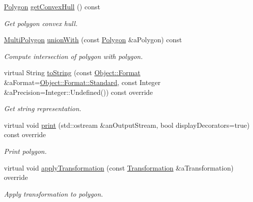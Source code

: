 \begin{DoxyCompactItemize}
\hyperlink{classostk_1_1math_1_1geom_1_1d2_1_1objects_1_1_polygon}{Polygon} \hyperlink{classostk_1_1math_1_1geom_1_1d2_1_1objects_1_1_polygon_a82a1c0d6a76ee136829e0668bdd5c4a6}{get\+Convex\+Hull} () const
\begin{DoxyCompactList}\small\item\em Get polygon convex hull. \end{DoxyCompactList}\item 
\hyperlink{classostk_1_1math_1_1geom_1_1d2_1_1objects_1_1_multi_polygon}{Multi\+Polygon} \hyperlink{classostk_1_1math_1_1geom_1_1d2_1_1objects_1_1_polygon_ad01feda42e80b74752d3529bc122981b}{union\+With} (const \hyperlink{classostk_1_1math_1_1geom_1_1d2_1_1objects_1_1_polygon}{Polygon} \&a\+Polygon) const
\begin{DoxyCompactList}\small\item\em Compute intersection of polygon with polygon. \end{DoxyCompactList}\item 
virtual String \hyperlink{classostk_1_1math_1_1geom_1_1d2_1_1objects_1_1_polygon_a6e672ccf5f1101de80e636f097f0a0f7}{to\+String} (const \hyperlink{classostk_1_1math_1_1geom_1_1d2_1_1_object_aa76f9e30caebf4005bafbdff447f66cf}{Object\+::\+Format} \&a\+Format=\hyperlink{classostk_1_1math_1_1geom_1_1d2_1_1_object_aa76f9e30caebf4005bafbdff447f66cfaeb6d8ae6f20283755b339c0dc273988b}{Object\+::\+Format\+::\+Standard}, const Integer \&a\+Precision=Integer\+::\+Undefined()) const override
\begin{DoxyCompactList}\small\item\em Get string representation. \end{DoxyCompactList}\item 
virtual void \hyperlink{classostk_1_1math_1_1geom_1_1d2_1_1objects_1_1_polygon_adbf6ed9930a6dd2f3eab1c5c1b256ded}{print} (std\+::ostream \&an\+Output\+Stream, bool display\+Decorators=true) const override
\begin{DoxyCompactList}\small\item\em Print polygon. \end{DoxyCompactList}\item 
virtual void \hyperlink{classostk_1_1math_1_1geom_1_1d2_1_1objects_1_1_polygon_a00d04368f01daa0b234b403321453bbf}{apply\+Transformation} (const \hyperlink{classostk_1_1math_1_1geom_1_1d2_1_1_transformation}{Transformation} \&a\+Transformation) override
\begin{DoxyCompactList}\small\item\em Apply transformation to polygon. \end{DoxyCompactList}\end{DoxyCompactItemize}

